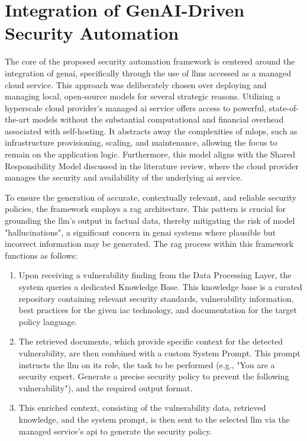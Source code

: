 

\section{Integration of GenAI-Driven Security Automation} %
\label{sub:Integration of GenAI-Driven Security Automation}

The core of the proposed security automation framework is centered around the integration of \gls{genai}, specifically through the use of \glspl{llm} accessed as a managed cloud service. This approach was deliberately chosen over deploying and managing local, open-source models for several strategic reasons. Utilizing a hyperscale cloud provider's managed \gls{ai} service offers access to powerful, state-of-the-art models without the substantial computational and financial overhead associated with self-hosting. It abstracts away the complexities of \gls{mlops}, such as infrastructure provisioning, scaling, and maintenance, allowing the focus to remain on the application logic. Furthermore, this model aligns with the Shared Responsibility Model discussed in the literature review, where the cloud provider manages the security and availability of the underlying \gls{ai} service.

To ensure the generation of accurate, contextually relevant, and reliable security policies, the framework employs a \gls{rag} architecture. This pattern is crucial for grounding the \gls{llm}'s output in factual data, thereby mitigating the risk of model "hallucinations", a significant concern in \gls{genai} systems where plausible but incorrect information may be generated. The \gls{rag} process within this framework functions as follows:

\begin{enumerate}
    \item Upon receiving a vulnerability finding from the Data Processing Layer, the system queries a dedicated Knowledge Base. This knowledge base is a curated repository containing relevant security standards, vulnerability information, best practices for the given \gls{iac} technology, and documentation for the target policy language.
    \item The retrieved documents, which provide specific context for the detected vulnerability, are then combined with a custom System Prompt. This prompt instructs the \gls{llm} on its role, the task to be performed (e.g., "You are a security expert. Generate a precise security policy to prevent the following vulnerability"), and the required output format.
    \item This enriched context, consisting of the vulnerability data, retrieved knowledge, and the system prompt, is then sent to the selected \gls{llm} via the managed service's \gls{api} to generate the security policy.
\end{enumerate}


